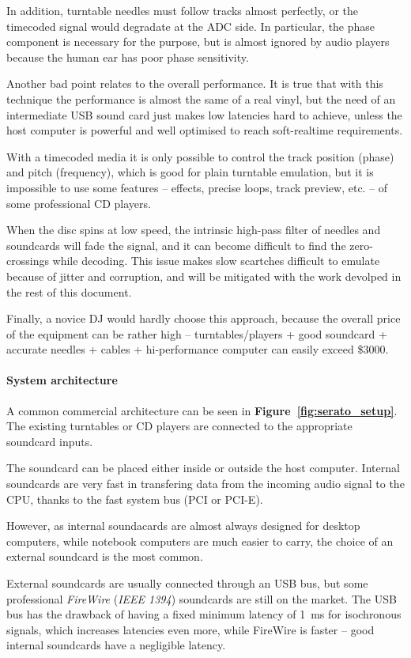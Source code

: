 \documentclass[a4paper,10pt]{article}
\newcommand{\citef}[1]{\textbf{Figure~\ref{#1}}}
\begin{document}
\begin{multicols}{2}
In addition, turntable needles must follow tracks almost perfectly, or the
timecoded signal would degradate at the ADC side. In particular, the phase
component is necessary for the purpose, but is almost ignored by audio players
because the human ear has poor phase sensitivity.

Another bad point relates to the overall performance. It is true that with
this technique the performance is almost the same of a real vinyl, but the
need of an intermediate USB sound card  just makes low latencies hard to
achieve, unless the host computer is powerful and well optimised to reach
soft-realtime requirements.

With a timecoded media it is only possible to control the track position
(phase) and pitch (frequency), which is good for plain turntable emulation,
but it is impossible to use some features -- effects, precise loops, track
preview, etc. -- of some professional CD players.

When the disc spins at low speed, the intrinsic high-pass filter of needles
and soundcards will fade the signal, and it can become difficult to find the
zero-crossings while decoding. This issue makes slow scartches difficult to
emulate because of jitter and corruption, and will be mitigated with the work
devolped in the rest of this document.

Finally, a novice DJ would hardly choose this approach, because the overall
price of the equipment can be rather high -- turntables/players + good
soundcard + accurate needles + cables + hi-performance computer can easily
exceed \$3000. 


\paragraph{System architecture}
A common commercial architecture \cite{rane_ssl} \cite{ni_tsp} can be seen in
\citef{fig:serato_setup}. The existing turntables or CD players are connected
to the appropriate soundcard inputs.

The soundcard can be placed either inside or outside the host computer.
Internal soundcards are very fast in transfering data from the incoming audio
signal to the CPU, thanks to the fast system bus (PCI or PCI-E).

However, as internal soundacards are almost always designed for desktop
computers, while notebook computers are much easier to carry, the choice of an
external soundcard is the most common.

External soundcards are usually connected through an USB bus, but some
professional \emph{FireWire} (\emph{IEEE 1394}) soundcards are still on the
market. The USB bus has the drawback of having a fixed minimum latency of 1~ms
for isochronous signals, which increases latencies even more, while FireWire
is faster -- good internal soundcards have a negligible latency.


\end{multicols}
\end{document}
